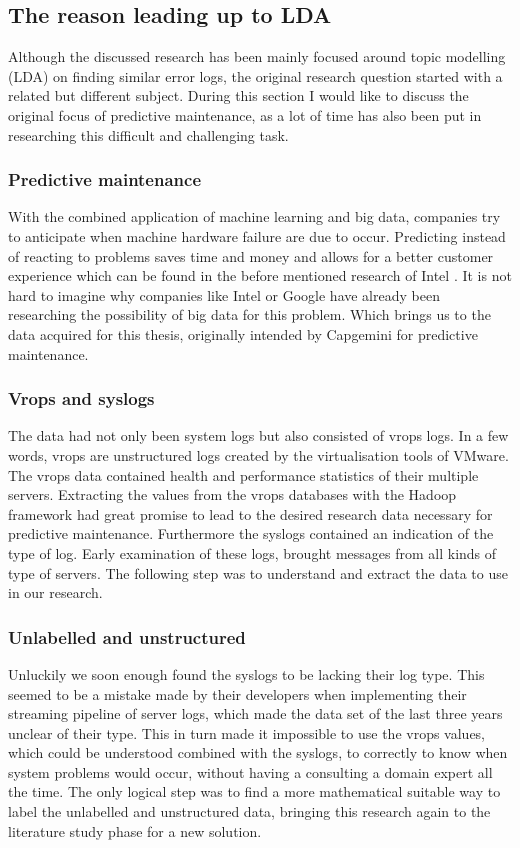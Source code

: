 \subsection{The reason leading up to LDA}\label{conclusion:discussion}
Although the discussed research has been mainly focused around topic modelling (LDA) on finding similar error logs, the original research question started with a related but different subject. During this section I would like to discuss the original focus of predictive maintenance, as a lot of time has also been put in researching this difficult and challenging task. 

\subsubsection{Predictive maintenance}
With the combined application of machine learning and big data, companies try to anticipate when machine hardware failure are due to occur. Predicting instead of reacting to problems saves time and money and allows for a better customer experience which can be found in the before mentioned research of Intel \cite{Sipos2014Log-basedMaintenance}\cite{AjayChandramoulyRavindraNarkhedeVijayMungaraGuillermoRueda2013ReducingAnalytics}. It is not hard to imagine why companies like Intel  or Google have already been researching the possibility of big data for this problem. Which brings us to the data acquired for this thesis, originally intended by Capgemini for predictive maintenance. 

\subsubsection{Vrops and syslogs}
The data had not only been system logs but also consisted of vrops logs. In a few words, vrops are unstructured logs created by the virtualisation tools of VMware. The vrops data contained health and performance statistics of their multiple servers. Extracting the values from the vrops databases with the Hadoop framework had great promise to lead to the desired research data necessary for predictive maintenance. Furthermore the syslogs contained an indication of the type of log. Early examination of these logs, brought  messages from all kinds of type of servers. The following step was to understand and extract the data to use in our research.

\subsubsection{Unlabelled and unstructured}
Unluckily we soon enough found the syslogs to be lacking their log type. This seemed to be a mistake made by their developers when implementing their streaming pipeline of server logs, which made the data set of the last three years unclear of their type. This in turn made it impossible to use the vrops values, which could be understood combined with the syslogs, to correctly to know when system problems would occur, without having a consulting a domain expert all the time. The only logical step was to find a more mathematical suitable way to label the unlabelled and unstructured data, bringing this research again to the literature study phase for a new solution.

